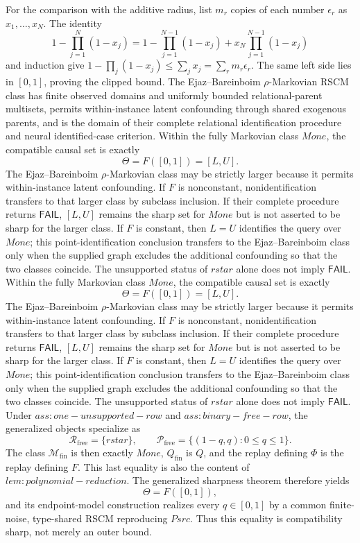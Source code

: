 For the comparison with the additive radius, list \(m_r\) copies of each number \(\epsilon_r\) as \(x_1,\ldots,x_N\).  The identity
\[
 1-\prod_{j=1}^N(1-x_j)
 =1-\prod_{j=1}^{N-1}(1-x_j)+x_N\prod_{j=1}^{N-1}(1-x_j)
\]
and induction give \(1-\prod_j(1-x_j)\leq\sum_jx_j=\sum_rm_r\epsilon_r\).  The same left side lies in \([0,1]\), proving the clipped bound.
The Ejaz--Bareinboim \(\rho\)-Markovian RSCM class has finite observed domains and uniformly bounded relational-parent multisets, permits within-instance latent confounding through shared exogenous parents, and is the domain of their complete relational identification procedure and neural identified-case criterion.
Within the fully Markovian class \(Mone\), the compatible causal set is exactly
\[
 \Theta=F([0,1])=[L,U].
\]
The Ejaz--Bareinboim \(\rho\)-Markovian class may be strictly larger because it permits within-instance latent confounding.  If \(F\) is nonconstant, nonidentification transfers to that larger class by subclass inclusion.  If their complete procedure returns \(\mathsf{FAIL}\), \([L,U]\) remains the sharp set for \(Mone\) but is not asserted to be sharp for the larger class.  If \(F\) is constant, then \(L=U\) identifies the query over \(Mone\); this point-identification conclusion transfers to the Ejaz--Bareinboim class only when the supplied graph excludes the additional confounding so that the two classes coincide.  The unsupported status of \(rstar\) alone does not imply \(\mathsf{FAIL}\).
Within the fully Markovian class \(Mone\), the compatible causal set is exactly
\[
 \Theta=F([0,1])=[L,U].
\]
The Ejaz--Bareinboim \(\rho\)-Markovian class may be strictly larger because it permits within-instance latent confounding.  If \(F\) is nonconstant, nonidentification transfers to that larger class by subclass inclusion.  If their complete procedure returns \(\mathsf{FAIL}\), \([L,U]\) remains the sharp set for \(Mone\) but is not asserted to be sharp for the larger class.  If \(F\) is constant, then \(L=U\) identifies the query over \(Mone\); this point-identification conclusion transfers to the Ejaz--Bareinboim class only when the supplied graph excludes the additional confounding so that the two classes coincide.  The unsupported status of \(rstar\) alone does not imply \(\mathsf{FAIL}\).
Under \(ass:one-unsupported-row\) and \(ass:binary-free-row\), the generalized objects specialize as
\[
 \mathcal R_{\mathrm{free}}=\{rstar\},\qquad
 \mathcal P_{\mathrm{free}}=\{(1-q,q):0\leq q\leq1\}.
\]
The class \(\mathcal M_{\mathrm{fin}}\) is then exactly \(Mone\), \(Q_{\mathrm{fin}}\) is \(Q\), and the replay defining \(\Phi\) is the replay defining \(F\).  This last equality is also the content of \(lem:polynomial-reduction\).  The generalized sharpness theorem therefore yields
\[
 \Theta=F([0,1]),
\]
and its endpoint-model construction realizes every \(q\in[0,1]\) by a common finite-noise, type-shared RSCM reproducing \(Psrc\).  Thus this equality is compatibility sharp, not merely an outer bound.

